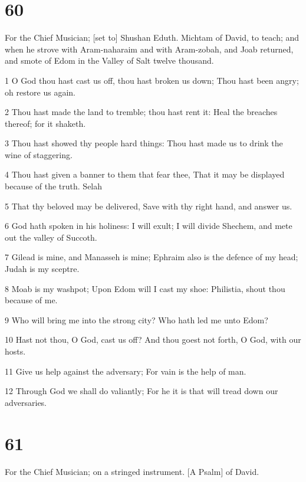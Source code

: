 \chapter{60}

\par For the Chief Musician; [set to] Shushan Eduth. Michtam of David, to teach; and when he strove with Aram-naharaim and with Aram-zobah, and Joab returned, and smote of Edom in the Valley of Salt twelve thousand.

\par 1 O God thou hast cast us off, thou hast broken us down; Thou hast been angry; oh restore us again.
\par 2 Thou hast made the land to tremble; thou hast rent it: Heal the breaches thereof; for it shaketh.
\par 3 Thou hast showed thy people hard things: Thou hast made us to drink the wine of staggering.
\par 4 Thou hast given a banner to them that fear thee, That it may be displayed because of the truth. Selah
\par 5 That thy beloved may be delivered, Save with thy right hand, and answer us.
\par 6 God hath spoken in his holiness: I will exult; I will divide Shechem, and mete out the valley of Succoth.
\par 7 Gilead is mine, and Manasseh is mine; Ephraim also is the defence of my head; Judah is my sceptre.
\par 8 Moab is my washpot; Upon Edom will I cast my shoe: Philistia, shout thou because of me.
\par 9 Who will bring me into the strong city? Who hath led me unto Edom?
\par 10 Hast not thou, O God, cast us off? And thou goest not forth, O God, with our hosts.
\par 11 Give us help against the adversary; For vain is the help of man.
\par 12 Through God we shall do valiantly; For he it is that will tread down our adversaries.

\chapter{61}

\par For the Chief Musician; on a stringed instrument. [A Psalm] of David.

